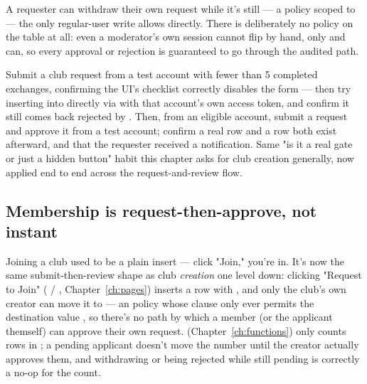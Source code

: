 A requester can withdraw their own request while it's still  — a  policy scoped to  — the only regular-user write  allows directly. There is deliberately no  policy on the table at all: even a moderator's own session cannot flip  by hand, only  and  can, so every approval or rejection is guaranteed to go through the audited path.

\begin{olktask}
Submit a club request from a test account with fewer than 5 completed exchanges, confirming the UI's checklist correctly disables the form — then try inserting into  directly via  with that account's own access token, and confirm it still comes back rejected by . Then, from an eligible account, submit a request and approve it from a  test account; confirm a real  row and a  row both exist afterward, and that the requester received a notification. Same "is it a real gate or just a hidden button" habit this chapter asks for club creation generally, now applied end to end across the request-and-review flow.
\end{olktask}

\subsection*{Membership is request-then-approve, not instant}

Joining a club used to be a plain  insert — click "Join," you're in. It's now the same submit-then-review shape as club \emph{creation} one level down: clicking "Request to Join" ( / , Chapter~\ref{ch:pages}) inserts a  row with , and only the club's own creator can move it to  — an  policy whose  clause only ever permits the destination value , so there's no path by which a member (or the applicant themself) can approve their own request.  (Chapter~\ref{ch:functions}) only counts  rows in ; a pending applicant doesn't move the number until the creator actually approves them, and withdrawing or being rejected while still pending is correctly a no-op for the count.

